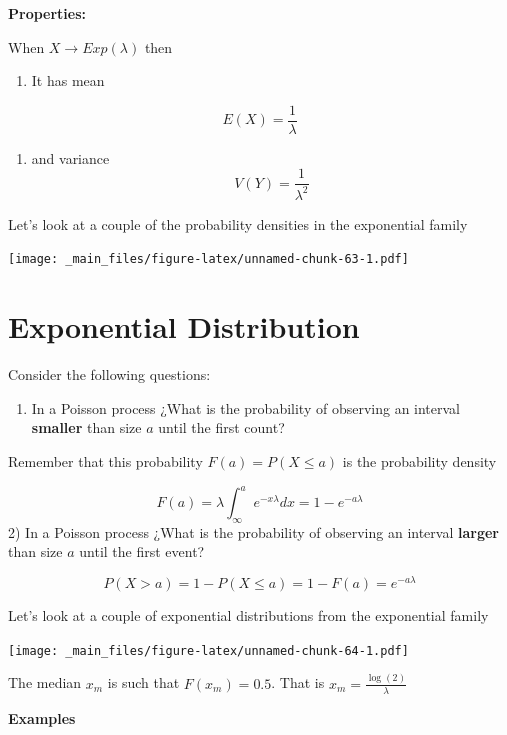\documentclass[
]{book}
\providecommand{\tightlist}{%
  \setlength{\itemsep}{0pt}\setlength{\parskip}{0pt}}
\begin{document}
\textbf{Properties:}

When \(X \rightarrow Exp(\lambda)\) then

\begin{enumerate}
\def\labelenumi{\arabic{enumi})}
\tightlist
\item
  It has mean
\end{enumerate}

\[E(X)=\frac{1}{\lambda}\]

\begin{enumerate}
\def\labelenumi{\arabic{enumi})}
\setcounter{enumi}{1}
\tightlist
\item
  and variance
  \[V(Y)=\frac{1}{\lambda^2}\]
\end{enumerate}

Let's look at a couple of the probability densities in the exponential family

\texttt{[image: \_main\_files/figure-latex/unnamed-chunk-63-1.pdf]}

\hypertarget{exponential-distribution}{%
\section{Exponential Distribution}\label{exponential-distribution}}

Consider the following questions:

\begin{enumerate}
\def\labelenumi{\arabic{enumi})}
\tightlist
\item
  In a Poisson process ¿What is the probability of observing an interval \textbf{smaller} than size \(a\) until the first count?
\end{enumerate}

Remember that this probability \(F(a)=P(X \leq a)\) is the probability density

\[F(a)=\lambda \int_\infty^a e^{-x\lambda}dx=1-e^{-a\lambda}\]
2) In a Poisson process ¿What is the probability of observing an interval \textbf{larger} than size \(a\) until the first event?

\[P(X > a)=1- P(X \leq a)= 1- F(a) = e^{-a\lambda}\]

Let's look at a couple of exponential distributions from the exponential family

\texttt{[image: \_main\_files/figure-latex/unnamed-chunk-64-1.pdf]}

The median \(x_m\) is such that \(F(x_m)=0.5\). That is \(x_m=\frac{\log(2)}{\lambda}\)

\textbf{Examples}
\end{document}
